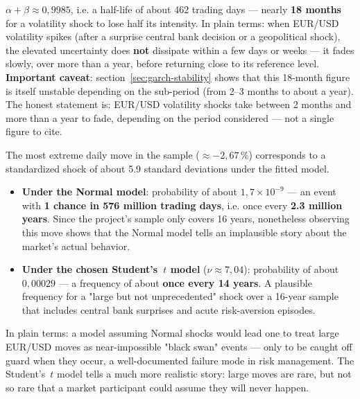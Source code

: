 \documentclass[12pt,a4paper]{article}
\begin{document}
\begin{econbox}
	
	$\alpha+\beta \approx 0{,}9985$, i.e. a half-life of about 462
	trading days --- nearly \textbf{18 months} for a volatility shock
	to lose half its intensity. In plain terms: when EUR/USD
	volatility spikes (after a surprise central bank decision or
	a geopolitical shock), the elevated uncertainty does \textbf{not}
	dissipate within a few days or weeks --- it fades slowly, over more
	than a year, before returning close to its reference level.
	\textbf{Important caveat}: section~\ref{sec:garch-stability}
	shows that this 18-month figure is itself unstable depending on the
	sub-period (from 2--3 months to about a year). The honest statement is:
	EUR/USD volatility shocks take between 2 months and more than
	a year to fade, depending on the period considered --- not a single
	figure to cite.
\end{econbox}

\newpage

\begin{econbox} 
	
	The most extreme daily move in the sample
	($\approx -2{,}67\,\%$) corresponds to a standardized shock
	of about 5.9 standard deviations under the fitted model.
	\begin{itemize}
		\item \textbf{Under the Normal model}: probability of about
		$1{,}7\times 10^{-9}$ --- an event with \textbf{1 chance in
			576 million trading days}, i.e. once every
		\textbf{2.3 million years}. Since the project's sample only
		covers 16 years, nonetheless observing this move shows that
		the Normal model tells an implausible story about
		the market's actual behavior.
		\item \textbf{Under the chosen Student's~$t$ model} ($\nu \approx 7{,}04$):
		probability of about $0{,}00029$ --- a frequency of about
		\textbf{once every 14 years}. A plausible frequency for a
		"large but not unprecedented" shock over a 16-year sample
		that includes central bank surprises and acute
		risk-aversion episodes.
	\end{itemize}
	In plain terms: a model assuming Normal shocks would lead one to treat
	large EUR/USD moves as near-impossible "black swan" events
	--- only to be caught off guard when they occur, a well-documented
	failure mode in risk management. The Student's~$t$ model tells a
	much more realistic story: large moves are rare, but not so rare
	that a market participant could assume they will
	never happen.
\end{econbox}
\end{document}
